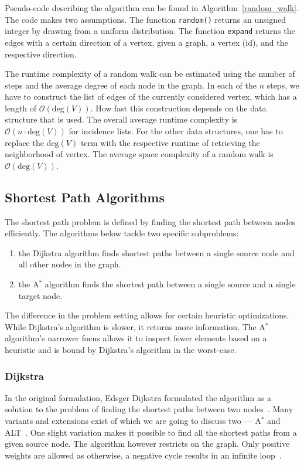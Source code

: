                 Pseudo-code describing the algorithm can be found in Algorithm~\ref{random_walk}. 
                The code makes two assumptions. The function \texttt{random()} returns an unsigned integer by drawing from a uniform distribution. 
                The function \texttt{expand} returns the edges with a certain direction of a vertex, given a graph, a vertex (id), and the respective direction.
                
                The runtime complexity of a random walk can be estimated using the number of steps and the average degree of each node in the graph. 
                In each of the $n$ steps, we have to construct the list of edges of the currently considered vertex, which has a length of $\mathcal{O}(\text{deg}(V))$. 
                How fast this construction depends on the data structure that is used. 
                The overall average runtime complexity is $\mathcal{O}(n \cdot \text{deg}(V))$ for incidence lists. 
                For the other data structures, one has to replace the $\text{deg}(V)$ term with the respective runtime of retrieving the neighborhood of vertex. 
                The average space complexity of a random walk is $\mathcal{O}(\text{deg}(V))$.
        
    \subsection{Shortest Path Algorithms}
        The shortest path problem is defined by finding the shortest path between nodes efficiently.
        The algorithms below tackle two specific subproblems:
        \begin{enumerate}
         \item the Dijkstra algorithm finds shortest paths between a single source node and all other nodes in the graph.
         \item the A$^*$ algorithm finds the shortest path between a single source and a single target node.
        \end{enumerate}
        The difference in the problem setting allows for certain heuristic optimizations. 
        While Dijkstra's algorithm is slower, it returns more information.
        The A$^*$ algorithm's narrower focus allows it to inspect fewer elements based on a heuristic and is bound by Dijkstra's algorithm in the worst-case.

        \subsubsection*{Dijkstra} 
            In the original formulation, Edsger Dijkstra formulated the algorithm as a solution to the problem of finding the shortest paths between two nodes~\autocite{dijkstra1959note}. 
            Many variants and extensions exist of which we are going to discuss two --- A$^*$ and ALT~\autocite{hart1968formal, goldberg2005computing}. 
            One slight variation makes it possible to find all the shortest paths from a given source node.
            The algorithm however restricts on the graph.
            Only positive weights are allowed as otherwise, a negative cycle results in an infinite loop~\autocite{cormen2009introduction}. 
            
